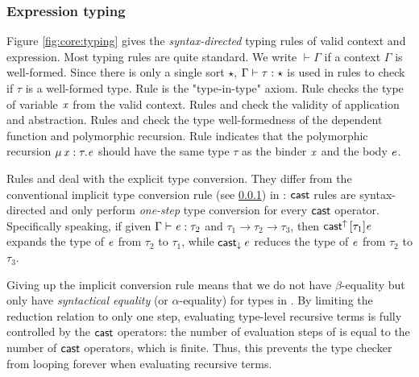 \subsubsection{Expression typing}
Figure \ref{fig:core:typing} gives the \emph{syntax-directed} typing rules of valid context and expression. Most typing rules are quite standard. We write $\vdash  \Gamma$ if a context $\Gamma$ is well-formed. Since there is only a single sort $\star$, $\Gamma  \vdash  \tau  :  \star$ is used in rules to check if $\tau$ is a well-formed type. Rule  is the "type-in-type" axiom. Rule  checks the type of variable $\mathit{x}$ from the valid context. Rules  and  check the validity of application and abstraction. Rules  and  check the type well-formedness of the dependent function and polymorphic recursion. Rule  indicates that the polymorphic recursion $\mu \, \mathit{x}  :  \tau  .  \mathit{e}$ should have the same type $\tau$ as the binder $\mathit{x}$ and the body $\mathit{e}$.

Rules  and  deal with the explicit type conversion. They differ from the conventional implicit type conversion rule (see \ref{}) in \cc: $\mathsf{cast}$ rules are syntax-directed and only perform \emph{one-step} type conversion for every $\mathsf{cast}$ operator. Specifically speaking, if given $\Gamma  \vdash  \mathit{e}  :  \tau_{{\mathrm{2}}}$ and $\tau_{{\mathrm{1}}}  \longrightarrow  \tau_{{\mathrm{2}}}  \longrightarrow  \tau_{{\mathrm{3}}}$, then $\mathsf{cast}^{\uparrow} \, [  \tau_{{\mathrm{1}}}  ]  \mathit{e}$ expands the type of $\mathit{e}$ from $\tau_{{\mathrm{2}}}$ to $\tau_{{\mathrm{1}}}$, while $\mathsf{cast}_{\downarrow} \, \mathit{e}$ reduces the type of $\mathit{e}$ from $\tau_{{\mathrm{2}}}$ to $\tau_{{\mathrm{3}}}$. 

Giving up the implicit conversion rule means that we do not have $\beta$-equality but only have \emph{syntactical equality} (or $\alpha$-equality) for types in \name. By limiting the reduction relation to only one step, evaluating type-level recursive terms is fully controlled by the $\mathsf{cast}$ operators: the number of evaluation steps of is equal to the number of $\mathsf{cast}$ operators, which is finite. Thus, this prevents the type checker from looping forever when evaluating recursive terms.

